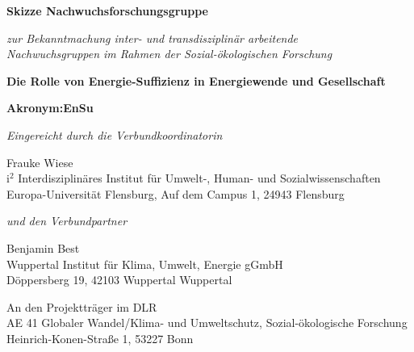 \begin{center}
{\LARGE\textbf{\textsf{Skizze Nachwuchsforschungsgruppe}}

\textsf{\textit{zur Bekanntmachung \glqq inter- und transdisziplinär arbeitende\\ Nachwuchsgruppen im Rahmen der Sozial-ökologischen Forschung\grqq} }
}

\vspace{0.5cm}

{\Huge
\textbf{\textsf{Die Rolle von Energie-Suffizienz in Energiewende und Gesellschaft\\
}}

\textbf{\textsf{}}
}

{\LARGE
\textbf{\textsf{Akronym:{EnSu}}}
}

\vspace{1.5cm}

\textit{Eingereicht durch die Verbundkoordinatorin}

{\parskip 0pt
Frauke Wiese\\
i$^{2}$ Interdisziplinäres Institut für Umwelt-, Human- und Sozialwissenschaften\\
Europa-Universität Flensburg, Auf dem Campus 1, 24943 Flensburg}

\vspace{0.3cm}

\textit{und den Verbundpartner}

{\parskip 0pt
Benjamin Best\\
Wuppertal Institut für Klima, Umwelt, Energie gGmbH\\
Döppersberg 19, 42103 Wuppertal Wuppertal}

\vspace{0.5cm}

An den Projektträger im DLR \\
AE 41 Globaler Wandel/Klima- und Umweltschutz, Sozial-ökologische Forschung \\
Heinrich-Konen-Straße 1, 53227 Bonn


\end{center}


\clearpage